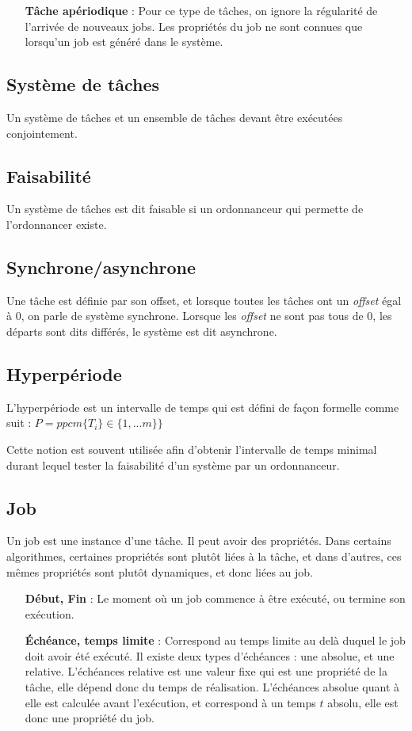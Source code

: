 \documentclass[11pt,a4paper,oneside]{report}
\begin{document}
\begin{itemize}
		\item[\textbf{Tâche apériodique}] : Pour ce type de tâches, on ignore la régularité de 
		l'arrivée de nouveaux jobs. Les propriétés du job ne sont connues que lorsqu'un job est 
		généré dans le système.
		
	\end{itemize}
	
	\subsection{Système de tâches}
	Un système de tâches et un ensemble de tâches devant être exécutées conjointement. 
	
	\subsection{Faisabilité}
	Un système de tâches est dit faisable si un ordonnanceur qui permette de 
	l'ordonnancer existe.
	
	\subsection{Synchrone/asynchrone}
	Une tâche est définie par son offset, et lorsque toutes les tâches ont un \textit{offset} égal à 0, on parle de 
	système synchrone. Lorsque les \textit{offset} ne sont pas tous de 0, les départs sont dits différés, 
	le système est dit asynchrone.
	
	\subsection{Hyperpériode}
	L'hyperpériode est un intervalle de temps qui est défini de façon formelle comme suit :\medskip
	$P = ppcm\{T_i\} \in \{1,... m\}\}$
	
	Cette notion est souvent utilisée afin d'obtenir l'intervalle de temps 
	minimal durant lequel tester la faisabilité d'un système par un ordonnanceur.
	
	\subsection{Job}
	Un job est une instance d'une tâche. 
	Il peut avoir des propriétés. 
	Dans certains algorithmes, certaines propriétés sont plutôt liées à la tâche, 
	et dans d'autres, ces mêmes propriétés sont plutôt dynamiques, et donc liées au job.
	\begin{itemize}
		\item[\textbf{Début, Fin}] : Le moment où un job commence à être exécuté, ou termine son exécution.
		\item[\textbf{Échéance, temps limite}] : Correspond au temps limite au delà duquel le job doit avoir été exécuté. Il existe deux types d'échéances : 
		une absolue, et une relative. L'échéances relative est une valeur fixe qui 
		est une propriété de la tâche, elle dépend donc du temps de réalisation.\medskip
		L'échéances absolue quant à elle est calculée avant l'exécution, et correspond 
		à un temps $t$ absolu, elle est donc une propriété du job.
	\end{itemize}
	
\end{document}
